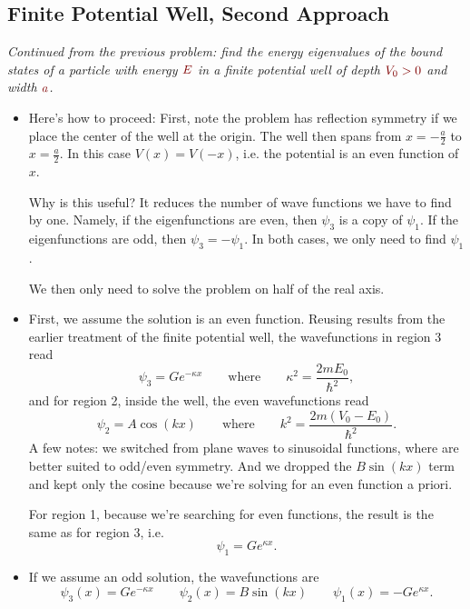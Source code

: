 \documentclass[11pt, a4paper]{article}
\newcommand{\dmath}[1]{\textcolor{Maroon}{#1}}  %
\newcommand{\eqtext}[1]{\qquad \text{#1} \qquad}
\begin{document}
\subsection{Finite Potential Well, Second Approach}
\textit{Continued from the previous problem: find the energy eigenvalues of the bound states of a particle with energy $ \dmath{E} $ in a finite potential well of depth $ \dmath{V_{0} > 0} $ and width $ \dmath{a} $.}
\begin{itemize}
	\item Here's how to proceed: First, note the problem has reflection symmetry if we place the center of the well at the origin. The well then spans from $ x = -\frac{a}{2} $ to $ x = \frac{a}{2} $. In this case $ V(x) = V(-x) $, i.e. the potential is an even function of $ x $. 
	
	Why is this useful? It reduces the number of wave functions we have to find by one. Namely, if the eigenfunctions are even, then $ \psi_{3} $ is a copy of $ \psi_{1} $. If the eigenfunctions are odd, then $ \psi_{3} = - \psi_{1} $. In both cases, we only need to find $ \psi_{1} $. 
	
	We then only need to solve the problem on half of the real axis.
	

		
	\item First, we assume the solution is an even function. Reusing results from the earlier treatment of the finite potential well, the wavefunctions in region 3 read
	\begin{equation*}
		\psi_{3} = Ge^{-\kappa x} \eqtext{where} \kappa^{2} = \frac{2mE_{0}}{\hbar^{2}},
	\end{equation*}
	and for region 2, inside the well, the even wavefunctions read
	\begin{equation*}
		\psi_{2} = A \cos(kx) \eqtext{where} k^{2} = \frac{2m(V_{0} - E_{0})}{\hbar^{2}}.
	\end{equation*}
	A few notes: we switched from plane waves to sinusoidal functions, where are better suited to odd/even symmetry. And we dropped the $B\sin(kx)$ term and kept only the cosine because we're solving for an even function a priori.
	
	For region 1, because we're searching for even functions, the result is the same as for region 3, i.e.
	\begin{equation*}
		\psi_{1} = G e^{\kappa x}.
	\end{equation*}
	
	\item If we assume an odd solution, the wavefunctions are
	\begin{equation*}
		\psi_{3}(x) = G e^{-\kappa x} \qquad \psi_{2}(x) = B \sin (kx) \qquad \psi_{1}(x) = -Ge^{\kappa x}.
	\end{equation*}
	

\end{itemize}
\end{document}
